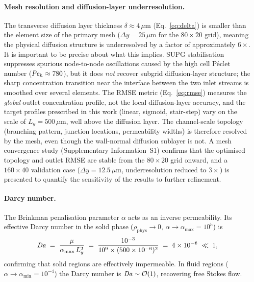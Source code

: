 \paragraph{Mesh resolution and diffusion-layer underresolution.}
The transverse diffusion layer thickness
$\delta \approx 4\,\mu\text{m}$ (Eq.~\eqref{eq:delta})
is smaller than the element size of the primary mesh
($\Delta y = 25\,\mu\text{m}$ for the $80\times20$ grid),
meaning the physical diffusion structure is underresolved by a factor
of approximately $6\times$.
It is important to be precise about what this implies.
SUPG stabilisation suppresses spurious node-to-node oscillations
caused by the high cell P\'eclet number
($\mathit{Pe}_h \approx 780$), but it does \emph{not} recover
subgrid diffusion-layer structure; the sharp concentration transition
near the interface between the two inlet streams is smoothed over
several elements.
The RMSE metric (Eq.~\eqref{eq:rmse}) measures the
\emph{global} outlet concentration profile, not the local diffusion-layer
accuracy, and the target profiles prescribed in this work (linear,
sigmoid, stair-step) vary on the scale of $L_y = 500\,\mu\text{m}$,
well above the diffusion layer.
The channel-scale topology (branching pattern, junction locations,
permeability widths) is therefore resolved by the mesh, even though
the wall-normal diffusion sublayer is not.
A mesh convergence study (Supplementary Information~S1) confirms
that the optimised topology and outlet RMSE are stable from the
$80\times20$ grid onward, and a $160\times40$ validation case
($\Delta y = 12.5\,\mu\text{m}$, underresolution reduced to $3\times$)
is presented to quantify the sensitivity of the results to
further refinement.

\paragraph{Darcy number.}
The Brinkman penalisation parameter $\alpha$ acts as an inverse
permeability. Its effective Darcy number in the solid phase
($\rho_{\mathrm{phys}}\!\to\!0$, $\alpha\!\to\!\alpha_{\max}=10^{5}$)
is
%
\begin{equation}
  \mathit{Da}
  \;=\; \frac{\mu}{\alpha_{\max}\,L_{y}^{2}}
  \;=\; \frac{10^{-3}}{10^{9}\times(500\times10^{-6})^{2}}
  \;=\; 4\times10^{-6} \;\ll\; 1,
  \label{eq:Da}
\end{equation}
%
confirming that solid regions are effectively impermeable.
In fluid regions ($\alpha\!\to\!\alpha_{\min}=10^{-4}$) the
Darcy number is $\mathit{Da}\sim\mathcal{O}(1)$, recovering free Stokes flow.

